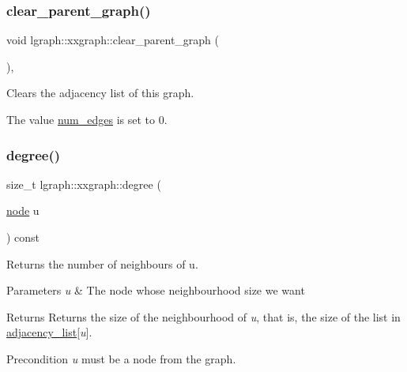 \subsubsection{\texorpdfstring{clear\+\_\+parent\+\_\+graph()}{clear\_parent\_graph()}}
{\footnotesize\ttfamily void lgraph\+::xxgraph\+::clear\+\_\+parent\+\_\+graph (\begin{DoxyParamCaption}{ }\end{DoxyParamCaption})\hspace{0.3cm}{\ttfamily [protected]}, {\ttfamily [inherited]}}



Clears the adjacency list of this graph. 

The value \hyperlink{classlgraph_1_1xxgraph_a6765a9a3be42f6e0f824635c593b35d7}{num\+\_\+edges} is set to 0. \mbox{\label{classlgraph_1_1xxgraph_a20ebc2927ee8fb8bb0a2c3b448d9ed78}} 
\subsubsection{\texorpdfstring{degree()}{degree()}}
{\footnotesize\ttfamily size\+\_\+t lgraph\+::xxgraph\+::degree (\begin{DoxyParamCaption}\item[{\hyperlink{namespacelgraph_a397169dd66adf725210a30fb7251773e}{node}}]{u }\end{DoxyParamCaption}) const\hspace{0.3cm}{\ttfamily [inherited]}}



Returns the number of neighbours of u. 


\begin{DoxyParams}{Parameters}
{\em u} & The node whose neighbourhood size we want \\
\hline
\end{DoxyParams}
\begin{DoxyReturn}{Returns}
Returns the size of the neighbourhood of {\itshape u}, that is, the size of the list in \hyperlink{classlgraph_1_1xxgraph_a31cf82d0b20be05290be259dc97a51ec}{adjacency\+\_\+list}\mbox{[}{\itshape u}\mbox{]}. 
\end{DoxyReturn}
\begin{DoxyPrecond}{Precondition}
{\itshape u} must be a node from the graph. 
\end{DoxyPrecond}
\mbox{\label{classlgraph_1_1wdgraph_a319aea927db9734903b4cf7d147ad687}} 

